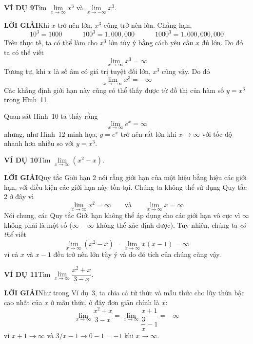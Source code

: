 \begin{minipage}[t]{0.70\textwidth}
  \vspace{0pt}%
  \setlength{\parindent}{0pt}
  \setlength{\parskip}{0pt}

  \noindent\textbf{\textsf{\color{stewartcyan}VÍ DỤ 9}}\hspace{1.2em}Tìm $\lim\limits_{x \to \infty} x^3$ và $\lim\limits_{x \to -\infty} x^3$.

  \medskip
  \noindent\textbf{\textsf{\color{stewartcyan}LỜI GIẢI}}\hspace{1.2em}Khi $x$ trở nên lớn, $x^3$ cũng trở nên lớn. Chẳng hạn,
  \[
  10^3 = 1000 \qquad\quad 100^3 = 1{,}000{,}000 \qquad\quad 1000^3 = 1{,}000{,}000{,}000
  \]
  Trên thực tế, ta có thể làm cho $x^3$ lớn tùy ý bằng cách yêu cầu $x$ đủ lớn. Do đó ta có thể viết
  \[
  \lim_{x \to \infty} x^3 = \infty
  \]
  Tương tự, khi $x$ là số âm có giá trị tuyệt đối lớn, $x^3$ cũng vậy. Do đó
  \[
  \lim_{x \to -\infty} x^3 = -\infty
  \]
  Các khẳng định giới hạn này cũng có thể thấy được từ đồ thị của hàm số $y = x^3$ trong Hình~11.\hfill\stewartbox

  \vspace{1em}
  Quan sát Hình~10 ta thấy rằng
  \[
  \lim_{x \to \infty} e^x = \infty
  \]
  nhưng, như Hình~12 minh họa, $y = e^x$ trở nên rất lớn khi $x \to \infty$ với tốc độ nhanh hơn nhiều so với $y = x^3$.

  \vspace{1.2em}
  \noindent\textbf{\textsf{\color{stewartcyan}VÍ DỤ 10}}\hspace{1.2em}Tìm $\lim\limits_{x \to \infty} (x^2 - x)$.

  \medskip
  \noindent\textbf{\textsf{\color{stewartcyan}LỜI GIẢI}}\hspace{1.2em}Quy tắc Giới hạn 2 nói rằng giới hạn của một hiệu bằng hiệu các giới hạn, với điều kiện các giới hạn này tồn tại. Chúng ta không thể sử dụng Quy tắc 2 ở đây vì
  \[
  \lim_{x \to \infty} x^2 = \infty \qquad \text{và} \qquad \lim_{x \to \infty} x = \infty
  \]
  \warningicon\hspace{0.5em}Nói chung, \textcolor{stewartred}{các Quy tắc Giới hạn không thể áp dụng cho các giới hạn vô cực} vì $\infty$ không phải là một số ($\infty - \infty$ không thể xác định được). Tuy nhiên, chúng ta \emph{có thể} viết
  \[
  \lim_{x \to \infty} (x^2 - x) = \lim_{x \to \infty} x(x - 1) = \infty
  \]
  vì cả $x$ và $x - 1$ đều trở nên lớn tùy ý và do đó tích của chúng cũng vậy.\hfill\stewartbox

  \vspace{1.2em}
  \noindent\textbf{\textsf{\color{stewartcyan}VÍ DỤ 11}}\hspace{1.2em}Tìm $\lim\limits_{x \to \infty} \dfrac{x^2 + x}{3 - x}$.

  \medskip
  \noindent\textbf{\textsf{\color{stewartcyan}LỜI GIẢI}}\hspace{1.2em}Như trong Ví dụ~3, ta chia cả tử thức và mẫu thức cho lũy thừa bậc cao nhất của $x$ ở mẫu thức, ở đây đơn giản chính là $x$:
  \[
  \lim_{x \to \infty} \frac{x^2 + x}{3 - x} = \lim_{x \to \infty} \frac{x + 1}{\dfrac{3}{x} - 1} = -\infty
  \]
  vì $x + 1 \to \infty$ và $3/x - 1 \to 0 - 1 = -1$ khi $x \to \infty$.\hfill\stewartbox
\end{minipage}
